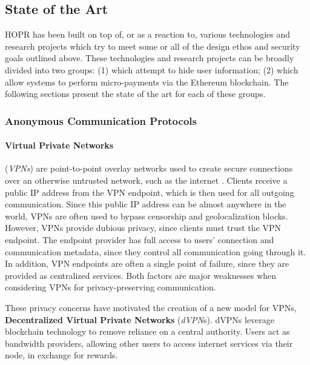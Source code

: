 \subsection{State of the Art}
\label{sec:intro:stateoftheart}

HOPR has been built on top of, or as a reaction to, various technologies and research projects which try to meet some or all of the design ethos and security goals outlined above. These technologies and research projects can be broadly divided into two groups: (1)  which attempt to hide user information; (2)  which allow systems to perform micro-payments via the Ethereum blockchain. The following sections present the state of the art for each of these groups.

\subsubsection{Anonymous Communication Protocols}
\label{sec:privacyprotocols}

\paragraph{Virtual Private Networks}(\textit{VPNs}) are point-to-point overlay networks used to create secure connections over an otherwise untrusted network, such as the internet \cite{venkateswaran_2001}. Clients receive a public IP address from the VPN endpoint, which is then used for all outgoing communication. Since this public IP address can be almost anywhere in the world, VPNs are often used to bypass censorship \cite{hobbs_roberts_2018} and geolocalization blocks. However, VPNs provide dubious privacy, since clients must trust the VPN endpoint. The endpoint provider has full access to users' connection and communication metadata, since they control all communication going through it. In addition, VPN endpoints are often a single point of failure, since they are provided as centralized services. Both factors are major weaknesses when considering VPNs for privacy-preserving communication.

These privacy concerns have motivated the creation of a new model for VPNs, \textbf{Decentralized Virtual Private Networks} (\textit{dVPN}s). dVPNs leverage blockchain technology to remove reliance on a central authority. Users act as bandwidth providers, allowing other users to access internet services via their node, in exchange for rewards.

